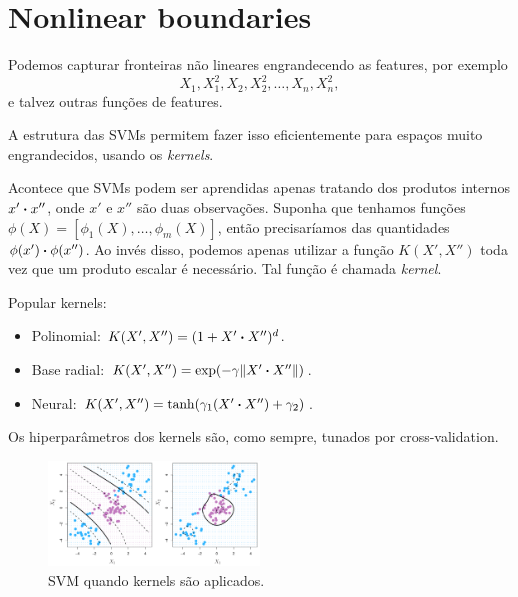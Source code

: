 \documentclass[a4paper,fleqn,12pt]{article}
\begin{document}
\section{Nonlinear boundaries}

Podemos capturar fronteiras não lineares engrandecendo as features, por exemplo
$$
X_1, X_1^2, X_2, X_2^2, \ldots, X_n, X_n^2,
$$
e talvez outras funções de features.

A estrutura das SVMs permitem fazer isso eficientemente para espaços muito engrandecidos, usando os \textit{kernels}.

Acontece que SVMs podem ser aprendidas apenas tratando dos produtos internos $x' \vdot x''$, onde $x'$ e $x''$ são duas observações. Suponha que tenhamos funções $\phi(X) = [\phi_1(X), \ldots, \phi_m(X)]$, então precisaríamos das quantidades $\phi(x') \vdot \phi(x'')$. Ao invés disso, podemos apenas utilizar a função $K(X', X'')$ toda vez que um produto escalar é necessário. Tal função é chamada \textit{kernel}.

\n

Popular kernels:
\begin{itemize}
\item Polinomial: $K(X', X'') = (1 + X' \vdot X'')^d$.
\item Base radial: $K(X', X'') = \exp(-\gamma\norm{X' \vdot X''})$.
\item Neural: $K(X', X'') = \tanh(\gamma_1(X' \vdot X'') + \gamma_2)$.
\end{itemize}

Os hiperparâmetros dos kernels são, como sempre, tunados por cross-validation.
\begin{figure}[H]
\centering
\includegraphics[width=0.5\textwidth]{fig/kernel.png}
\caption{SVM quando kernels são aplicados.}
\label{fig:kernel}
\end{figure}
\end{document}
